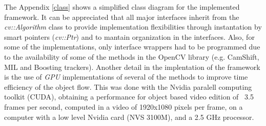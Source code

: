 The Appendix \ref{class} shows a simplified class diagram for the implemented framework. It can be appreciated that all major interfaces inherit from the {\it cv::Algorithm} class to provide 
implementation flexibilities through instantation by smart pointers ({\it cv::Ptr}) and to mantain organization in the interfaces. Also, for some of the implementations, only interface wrappers 
had to be programmed due to the availability of some of the methods in the OpenCV library (e.g. CamShift, MIL and Boosting trackers). Another detail in the 
implentation of the framework is the use of {\it GPU} implementations of several of the methods to improve time efficiency of the object flow. This was done with the Nvidia
paralell computing toolkit (CUDA), obtaining a performance for object based video edition of ~3.5 frames per second, computed in a video of 1920x1080 pixels per frame, on a computer with a 
low level Nvidia card (NVS 3100M), and a 2.5 GHz processor.

